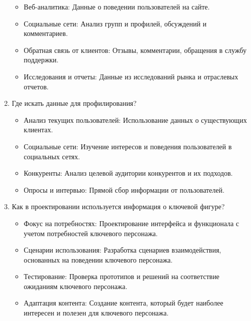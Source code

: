 \begin{enumerate}
    \begin{itemize}
        \item Веб-аналитика: Данные о поведении пользователей на сайте.
        \item Социальные сети: Анализ групп и профилей, обсуждений и комментариев.
        \item Обратная связь от клиентов: Отзывы, комментарии, обращения в службу поддержки.
        \item Исследования и отчеты: Данные из исследований рынка и отраслевых отчетов.
    \end{itemize}

\item Где искать данные для профилирования?
    \begin{itemize}
        \item Анализ текущих пользователей: Использование данных о существующих клиентах.
        \item Социальные сети: Изучение интересов и поведения пользователей в социальных сетях.
        \item Конкуренты: Анализ целевой аудитории конкурентов и их подходов.
        \item Опросы и интервью: Прямой сбор информации от пользователей.
    \end{itemize}

\item Как в проектировании используется информация о ключевой фигуре?
    \begin{itemize}
        \item Фокус на потребностях: Проектирование интерфейса и функционала с учетом потребностей ключевого персонажа.
        \item Сценарии использования: Разработка сценариев взаимодействия, основанных на поведении ключевого персонажа.
        \item Тестирование: Проверка прототипов и решений на соответствие ожиданиям ключевого персонажа.
        \item Адаптация контента: Создание контента, который будет наиболее интересен и полезен для ключевого персонажа.
    \end{itemize}
\end{enumerate}

\begin{enumerate}
\end{enumerate}


